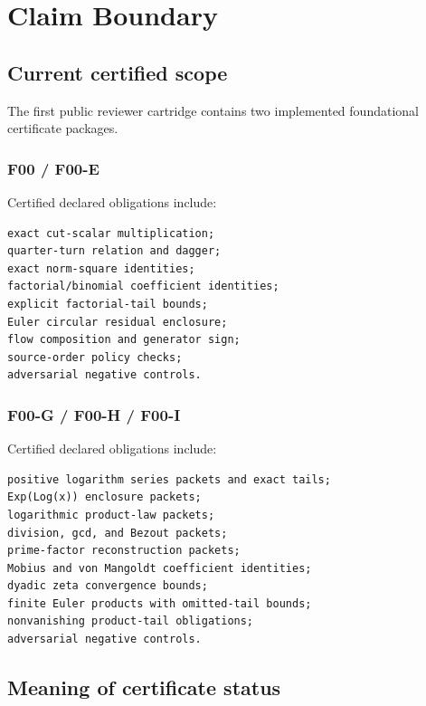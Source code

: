 \hypertarget{claim-boundary}{%
\chapter{Claim Boundary}\label{claim-boundary}}

\hypertarget{current-certified-scope}{%
\section{Current certified scope}\label{current-certified-scope}}

The first public reviewer cartridge contains two implemented foundational certificate packages.

\hypertarget{f00-f00-e}{%
\subsection{F00 / F00-E}\label{f00-f00-e}}

Certified declared obligations include:

\begin{verbatim}
exact cut-scalar multiplication;
quarter-turn relation and dagger;
exact norm-square identities;
factorial/binomial coefficient identities;
explicit factorial-tail bounds;
Euler circular residual enclosure;
flow composition and generator sign;
source-order policy checks;
adversarial negative controls.
\end{verbatim}

\hypertarget{f00-g-f00-h-f00-i}{%
\subsection{F00-G / F00-H / F00-I}\label{f00-g-f00-h-f00-i}}

Certified declared obligations include:

\begin{verbatim}
positive logarithm series packets and exact tails;
Exp(Log(x)) enclosure packets;
logarithmic product-law packets;
division, gcd, and Bezout packets;
prime-factor reconstruction packets;
Mobius and von Mangoldt coefficient identities;
dyadic zeta convergence bounds;
finite Euler products with omitted-tail bounds;
nonvanishing product-tail obligations;
adversarial negative controls.
\end{verbatim}

\hypertarget{meaning-of-certificate-status}{%
\section{Meaning of certificate status}\label{meaning-of-certificate-status}}

